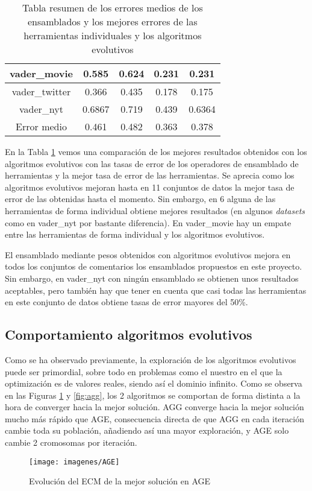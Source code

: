 \begin{table} [H]
{\begin{tabular}{|c|cccc|}
			vader\_movie & 0.585 & 0.624 &\cellcolor{greentable} 0.231 & \cellcolor{greentable} 0.231\\ \hline
			vader\_twitter & 0.366 & 0.435 & 0.178 & \cellcolor{greentable} 0.175\\ \hline
			vader\_nyt & 0.6867& 0.719 &\cellcolor{greentable} 0.439 & 0.6364\\ \hline
			Error medio & 0.461 & 0.482 & \cellcolor{greentable} 0.363 & 0.378 \\ \hline
		\end{tabular} 
	}
	\caption{Tabla resumen de los errores medios de los ensamblados y los mejores errores de las herramientas individuales y los algoritmos evolutivos}
	\label{table:combinacionesygeneticos}
\end{table}

En la Tabla \ref{table:combinacionesygeneticos} vemos una comparación de los mejores resultados obtenidos con los algoritmos evolutivos con las tasas de error de los operadores de ensamblado de herramientas y la mejor tasa de error de las herramientas. Se aprecia como los algoritmos evolutivos mejoran hasta en 11 conjuntos de datos la mejor tasa de error de las obtenidas hasta el momento. Sin embargo, en 6 alguna de las herramientas de forma individual obtiene mejores resultados (en algunos \textit{datasets} como en vader\_nyt por bastante diferencia). En vader\_movie hay un empate entre las herramientas de forma individual y los algoritmos evolutivos.

El ensamblado mediante pesos obtenidos con algoritmos evolutivos mejora en todos los conjuntos de comentarios los ensamblados propuestos en este proyecto. Sin embargo, en vader\_nyt con ningún ensamblado se obtienen unos resultados aceptables, pero también hay que tener en cuenta que casi todas las herramientas en este conjunto de datos obtiene tasas de error mayores del 50\%.

\subsection{Comportamiento algoritmos evolutivos}
Como se ha observado previamente, la exploración de los algoritmos evolutivos puede ser primordial, sobre todo en problemas como el nuestro en el que la optimización es de valores reales, siendo así el dominio infinito. Como se observa en las Figuras \ref{fig:age} y \ref{fig:agg}, los 2 algoritmos se comportan de forma distinta a la hora de converger hacia la mejor solución. AGG converge hacia la mejor solución mucho más rápido que AGE, consecuencia directa de que AGG en cada iteración cambie toda su población, añadiendo así una mayor exploración, y AGE solo cambie 2 cromosomas por iteración.
\begin{figure} [H]
	\centering
	\texttt{[image: imagenes/AGE]}
	\caption{Evolución del ECM de la mejor solución en AGE}
	\label{fig:age}
\end{figure}

